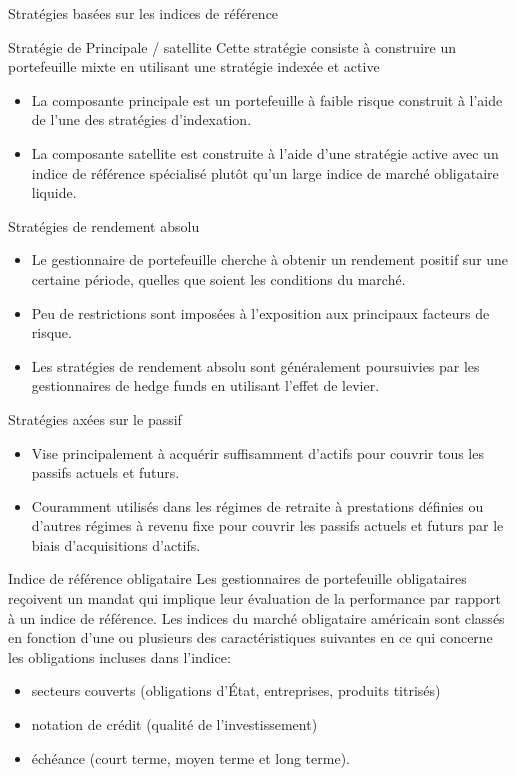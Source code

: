 \documentclass{beamer}
\begin{document}
\begin{frame}{Stratégies basées sur les indices de référence}
\begin{block}{Stratégie de Principale / satellite}
Cette stratégie consiste à construire un portefeuille mixte en utilisant une stratégie indexée et active
\begin{itemize}[label=\bullet]
\item La composante principale est un portefeuille à faible risque construit à l'aide de l'une des stratégies d'indexation.
\item La composante satellite est construite à l'aide d'une stratégie active avec un indice de référence spécialisé plutôt qu'un large indice de marché obligataire liquide.
\end{itemize}
\end{block}
\end{frame}

\begin{frame}{Stratégies de rendement absolu}
\begin{itemize}[label=\bullet]
\item Le gestionnaire de portefeuille cherche à obtenir un rendement positif sur une certaine période, quelles que soient les conditions du marché.
\item Peu de restrictions sont imposées à l'exposition aux principaux facteurs de risque.
\item Les stratégies de rendement absolu sont généralement poursuivies par les gestionnaires de hedge funds en utilisant l'effet de levier.
\end{itemize}
\end{frame}

\begin{frame}{Stratégies axées sur le passif}
\begin{itemize}[label=\bullet]
\item Vise principalement à acquérir suffisamment d'actifs pour couvrir tous les passifs actuels et futurs.
\item Couramment utilisés dans les régimes de retraite à prestations définies ou d'autres régimes à revenu fixe pour couvrir les passifs actuels et futurs par le biais d'acquisitions d'actifs.
\end{itemize}
\end{frame}


\begin{frame}{Indice de référence obligataire}
Les gestionnaires de portefeuille obligataires reçoivent un mandat qui implique leur évaluation de la performance par rapport à un indice de référence.  Les indices du marché obligataire américain sont classés en fonction d'une ou plusieurs des caractéristiques suivantes en ce qui concerne les obligations incluses dans l'indice:
\begin{itemize}[label=\bullet]
\item secteurs couverts (obligations d'État,  entreprises,  produits titrisés)
\item notation de crédit (qualité de l'investissement) 
\item échéance (court terme,  moyen terme et long terme).
\end{itemize}
\end{frame}
\end{document}
